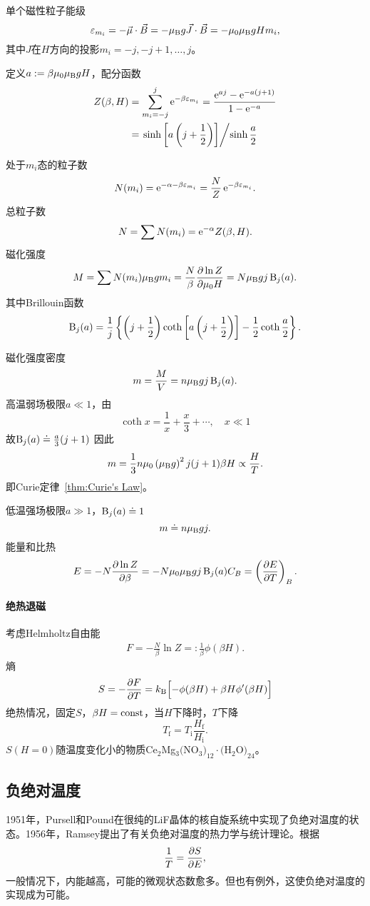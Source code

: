 单个磁性粒子能级
\[
	\varepsilon_{m_i}=-\vec\mu\cdot\vec B=-\mu_\mathrm B g\vec J\cdot\vec B=-\mu_0\mu_\mathrm B gHm_i,
\]
其中$J$在$H$方向的投影$m_i=-j,-j+1,\ldots,j$。

定义$a:=\beta\mu_0\mu_\mathrm B gH$，配分函数
\begin{align}\notag
	Z(\beta,H) & =\sum_{m_i=-j}^j\mathop{}\!\mathrm{e}^{-\beta\varepsilon_{m_i}}=\frac{\mathop{}\!\mathrm{e}^{aj}-\mathop{}\!\mathrm{e}^{-a(j+1)}}{1-\mathop{}\!\mathrm{e}^{-a}} \\
	           & =\left.\sinh\left[a\left(j+\frac12\right)\right]\middle\slash \sinh\frac a2\right.
\end{align}

处于$m_i$态的粒子数
\[
	N(m_i)=\mathop{}\!\mathrm{e}^{-\alpha-\beta\varepsilon_{m_i}}=\frac NZ\mathop{}\!\mathrm{e}^{-\beta\varepsilon_{m_i}}.
\]
总粒子数
\[
	N=\sum N(m_i)=\mathop{}\!\mathrm{e}^{-\alpha}Z(\beta,H).
\]
磁化强度
\[
	M=\sum N(m_i)\mu_\mathrm B gm_i=\frac N\beta\frac{\partial^{\;\!\!}\ln Z}{\partial \mu_0H^{\;\!\!}}=N\mu_\mathrm B gj\operatorname{B}_j(a).
\]
其中Brillouin函数
\[
	\operatorname{B}_j(a)=\frac1j\left\{\left(j+\frac12\right)\coth\left[a\left(j+\frac12\right)\right]-\frac12\coth\frac a2\right\}.
\]

磁化强度密度
\begin{align}
	m=\frac MV=n\muB gj\Brill_j(a). %
\end{align}
高温弱场极限$a\ll 1$，由
\[
	\coth x=\frac1x+\frac x3+\cdots,\quad x\ll 1
\]
故$\operatorname{B}_j(a)\doteq\frac a3(j+1)$
因此
\[
	m=\frac13n\mu_0\left(\mu_\mathrm B g\right)^2j(j+1)\beta H\propto\frac HT.
\]
即Curie定律~\ref{thm:Curie's Law}。

低温强场极限$a\gg 1$，$\operatorname{B}_j(a)\doteq 1$
\[
	m\doteq n\mu_\mathrm B gj.
\]
能量和比热
\begin{gather}
	E=-N\pv{\ln Z}\beta=-N\mu_0\muB gj\Brill_j(a)
	C_B=\kh{\pv ET}_B.
\end{gather}

\paragraph*{绝热退磁}考虑Helmholtz自由能
\begin{align}
	F=-\frac N\beta\ln Z=:\frac1\beta\phi(\beta H).
\end{align}
熵
\begin{align}
	S=-\frac{\partial^{\;\!\!}F}{\partial T^{\;\!\!}}=k_{\mathrm B}\Bigl[-\phi(\beta H)+\beta H\phi'(\beta H)\Bigr]
\end{align}
绝热情况，固定$S$，$\beta H=\mathrm{const}$，当$H$下降时，$T$下降
\[
	T_\mathrm f=T_\mathrm i\frac{H_\mathrm f}{H_\mathrm i}.
\]
$S(H=0)$随温度变化小的物质Ce$_2$Mg$_3($NO$_3)_{12}\cdot($H$_2$O$)_{24}$。
\subsection{负绝对温度}
1951年，Pursell和Pound在很纯的LiF晶体的核自旋系统中实现了负绝对温度的状态。1956年，Ramsey提出了有关负绝对温度的热力学与统计理论。根据
\[
	\frac1T=\frac{\partial^{\;\!\!}S}{\partial E^{\;\!\!}},
\]
一般情况下，内能越高，可能的微观状态数愈多。但也有例外，这使负绝对温度的实现成为可能。
